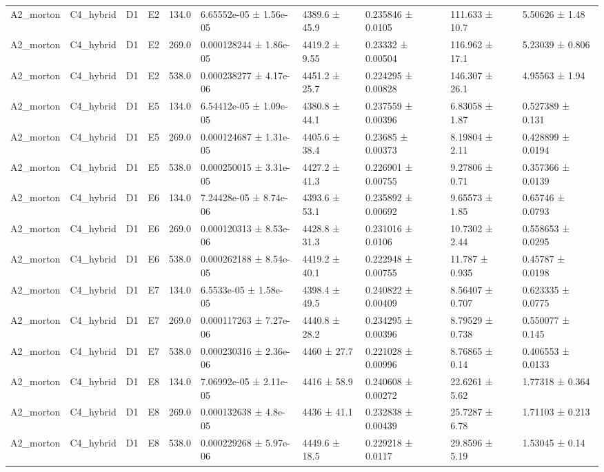\begin{table}
\begin{tabular}{llllllllll}
A2\_morton & C4\_hybrid & D1 & E2 & 134.0 & 6.65552e-05 ± 1.56e-05 & 4389.6 ± 45.9 & 0.235846 ± 0.0105 & 111.633 ± 10.7 & 5.50626 ± 1.48 \\
A2\_morton & C4\_hybrid & D1 & E2 & 269.0 & 0.000128244 ± 1.86e-05 & 4419.2 ± 9.55 & 0.23332 ± 0.00504 & 116.962 ± 17.1 & 5.23039 ± 0.806 \\
A2\_morton & C4\_hybrid & D1 & E2 & 538.0 & 0.000238277 ± 4.17e-06 & 4451.2 ± 25.7 & 0.224295 ± 0.00828 & 146.307 ± 26.1 & 4.95563 ± 1.94 \\
A2\_morton & C4\_hybrid & D1 & E5 & 134.0 & 6.54412e-05 ± 1.09e-05 & 4380.8 ± 44.1 & 0.237559 ± 0.00396 & 6.83058 ± 1.87 & 0.527389 ± 0.131 \\
A2\_morton & C4\_hybrid & D1 & E5 & 269.0 & 0.000124687 ± 1.31e-05 & 4405.6 ± 38.4 & 0.23685 ± 0.00373 & 8.19804 ± 2.11 & 0.428899 ± 0.0194 \\
A2\_morton & C4\_hybrid & D1 & E5 & 538.0 & 0.000250015 ± 3.31e-05 & 4427.2 ± 41.3 & 0.226901 ± 0.00755 & 9.27806 ± 0.71 & 0.357366 ± 0.0139 \\
A2\_morton & C4\_hybrid & D1 & E6 & 134.0 & 7.24428e-05 ± 8.74e-06 & 4393.6 ± 53.1 & 0.235892 ± 0.00692 & 9.65573 ± 1.85 & 0.65746 ± 0.0793 \\
A2\_morton & C4\_hybrid & D1 & E6 & 269.0 & 0.000120313 ± 8.53e-06 & 4428.8 ± 31.3 & 0.231016 ± 0.0106 & 10.7302 ± 2.44 & 0.558653 ± 0.0295 \\
A2\_morton & C4\_hybrid & D1 & E6 & 538.0 & 0.000262188 ± 8.54e-05 & 4419.2 ± 40.1 & 0.222948 ± 0.00755 & 11.787 ± 0.935 & 0.45787 ± 0.0198 \\
A2\_morton & C4\_hybrid & D1 & E7 & 134.0 & 6.5533e-05 ± 1.58e-05 & 4398.4 ± 49.5 & 0.240822 ± 0.00409 & 8.56407 ± 0.707 & 0.623335 ± 0.0775 \\
A2\_morton & C4\_hybrid & D1 & E7 & 269.0 & 0.000117263 ± 7.27e-06 & 4440.8 ± 28.2 & 0.234295 ± 0.00396 & 8.79529 ± 0.738 & 0.550077 ± 0.145 \\
A2\_morton & C4\_hybrid & D1 & E7 & 538.0 & 0.000230316 ± 2.36e-06 & 4460 ± 27.7 & 0.221028 ± 0.00996 & 8.76865 ± 0.14 & 0.406553 ± 0.0133 \\
A2\_morton & C4\_hybrid & D1 & E8 & 134.0 & 7.06992e-05 ± 2.11e-05 & 4416 ± 58.9 & 0.240608 ± 0.00272 & 22.6261 ± 5.62 & 1.77318 ± 0.364 \\
A2\_morton & C4\_hybrid & D1 & E8 & 269.0 & 0.000132638 ± 4.8e-05 & 4436 ± 41.1 & 0.232838 ± 0.00439 & 25.7287 ± 6.78 & 1.71103 ± 0.213 \\
A2\_morton & C4\_hybrid & D1 & E8 & 538.0 & 0.000229268 ± 5.97e-06 & 4449.6 ± 18.5 & 0.229218 ± 0.0117 & 29.8596 ± 5.19 & 1.53045 ± 0.14 \\

\end{tabular}
\end{table}

